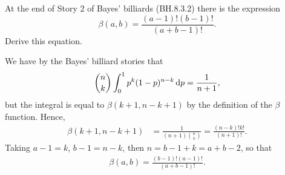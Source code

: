 \begin{exercise}
At the end of Story 2 of Bayes' billiards (BH.8.3.2) there is the expression
\begin{equation}
\label{eq:2}
\beta(a,b) = \frac{(a-1)!(b-1)!}{(a+b-1)!}.
\end{equation}
Derive this equation.
\begin{solution}
We have by the Bayes' billiard stories that
\begin{align}
  \label{}
{n \choose k} \int_0^1 p^k(1-p)^{n-k}\,\textrm{d}p = \frac{1}{n+1},
\end{align}
but the integral is equal to $\beta(k+1, n-k+1)$ by the definition of the $\beta$ function. Hence,
\begin{align*}
\beta(k+1, n-k+1)
&= \frac{1}{(n+1) {n \choose k}} = \frac{(n-k)!k!}{(n+1)!}.
\end{align*}
Taking $a-1 = k$, $b-1 =n -k$, then $n=b-1+k = a+b-2$, so that
\begin{align*}
\beta(a, b) = \frac{(b-1)!(a-1)!}{(a+b-1)!}.
\end{align*}
\end{solution}
\end{exercise}

